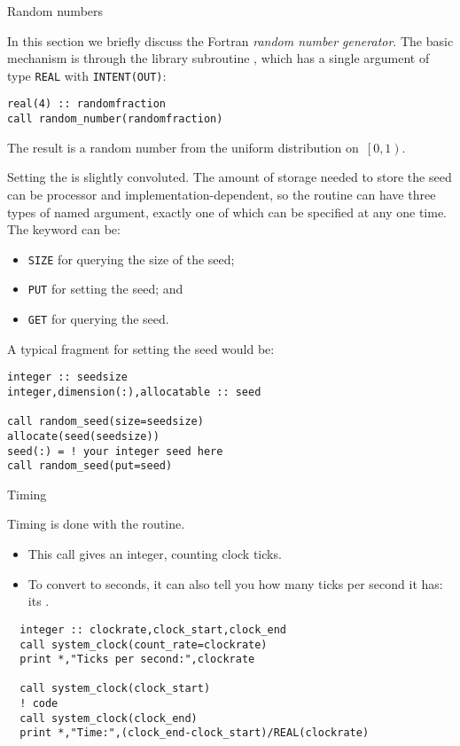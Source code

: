 
 {Random numbers}

In this section we briefly discuss the Fortran \emph{random number
  generator}.
The basic mechanism is through the library subroutine
, which has a single argument of type
\lstinline{REAL} with \lstinline{INTENT(OUT)}:
\begin{lstlisting}
real(4) :: randomfraction
call random_number(randomfraction)
\end{lstlisting}
The result is a random number from the uniform distribution
on~$\left[0,1\right)$.
  
Setting the  is slightly convoluted. The
amount of storage needed to store the seed can be processor and
implementation-dependent, so the routine 
can have three types of named argument, exactly one of which can be
specified at any one time. The keyword can be:
\begin{itemize}
\item \lstinline{SIZE} for querying the size of the seed;
\item \lstinline{PUT} for setting the seed; and
\item \lstinline{GET} for querying the seed.
\end{itemize}
A typical fragment for setting the seed would be:
\begin{lstlisting}
integer :: seedsize
integer,dimension(:),allocatable :: seed

call random_seed(size=seedsize)
allocate(seed(seedsize))
seed(:) = ! your integer seed here
call random_seed(put=seed)
\end{lstlisting}

 {Timing}

Timing is done with the  routine.
\begin{itemize}
\item This call gives an integer, counting clock ticks.
\item To convert to seconds, it can also tell you how many ticks per
  second it has: its .
\end{itemize}

\begin{lstlisting}
  integer :: clockrate,clock_start,clock_end
  call system_clock(count_rate=clockrate)
  print *,"Ticks per second:",clockrate

  call system_clock(clock_start)
  ! code
  call system_clock(clock_end)
  print *,"Time:",(clock_end-clock_start)/REAL(clockrate)
\end{lstlisting}
